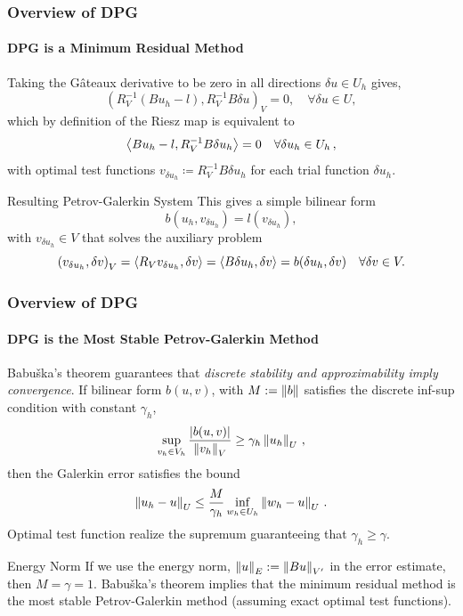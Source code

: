 \documentclass[18pt,xcolor=table]{beamer}
\begin{document}
\begin{frame}[t]
\frametitle{Overview of DPG}
\framesubtitle{DPG is a Minimum Residual Method}
Taking the G\^ateaux derivative to be zero in all directions $\delta u \in
U_h$ gives,
\[
\left(R_V^{-1}(Bu_h-l),R_V^{-1}B\delta u\right)_V = 0, \quad \forall \delta u \in U,
\]
which by definition of the Riesz map is equivalent to 
\begin{equation*}
\left\langle Bu_h-l,R_V^{-1}B\delta u_h \right\rangle=0\quad\forall\delta u_h\in U_h\,,
\end{equation*}
with optimal test functions $v_{\delta u_h}\coloneqq R_V^{-1}B\delta u_h$ for each trial function $\delta u_h$.
\begin{block}{Resulting Petrov-Galerkin System}
This gives a simple bilinear form
\begin{equation*}
b(u_h,v_{\delta u_h})=l(v_{\delta u_h}),
\end{equation*}
with $v_{\delta u_h}\in V$ that solves the auxiliary problem
\begin{equation*}
\left( v_{\delta u_h},\delta v \right)_V=\left\langle R_Vv_{\delta u_h},\delta v \right\rangle
=\left\langle B\delta u_h,\delta v \right\rangle=b(\delta u_h,\delta v)\quad\forall\delta v\in V.
\end{equation*}
\end{block}
\end{frame}


\begin{frame}[t]
\frametitle{Overview of DPG}
\framesubtitle{DPG is the Most Stable Petrov-Galerkin Method}
Babu\v{s}ka's theorem guarantees that \emph{discrete stability and approximability imply convergence}.
If bilinear form $b(u,v)$, with $M:=\left\| b \right\|$ satisfies the discrete inf-sup condition 
with constant $\gamma_h$,
\[
\sup_{v_h\in V_h}\frac{|b(u,v)|}{\left\| v_h \right\|_V}\geq\gamma_h\left\| u_h \right\|_U\,,
\]
then the Galerkin error satisfies the bound
\[
\left\| u_h-u \right\|_U\leq\frac{M}{\gamma_h}\inf_{w_h\in U_h}\left\| w_h-u \right\|_U\,.
\]
Optimal test function realize the supremum guaranteeing that $\gamma_h\geq\gamma$.\\
\begin{block}{Energy Norm}
If we use the energy norm, $\left\| u \right\|_E:=\left\| Bu \right\|_{V'}$ in the error estimate, then $M=\gamma=1$.
Babu\v{s}ka's theorem
implies that the minimum residual method is the most stable Petrov-Galerkin method (assuming exact optimal test functions).
\end{block}
\end{frame}
\end{document}
